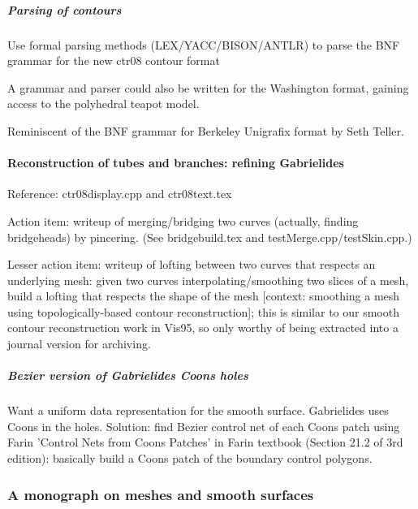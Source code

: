 \documentclass[11pt]{article}
\begin{document}

\subparagraph{Parsing of contours}

Use formal parsing methods (LEX/YACC/BISON/ANTLR) to parse the BNF grammar 
  for the new ctr08 contour format

A grammar and parser could also be written for the Washington format,
gaining access to the polyhedral teapot model.

Reminiscent of the BNF grammar for Berkeley Unigrafix format by Seth Teller.


\paragraph{Reconstruction of tubes and branches: refining Gabrielides}

Reference: ctr08display.cpp and ctr08text.tex

Action item: writeup of merging/bridging two curves (actually, finding bridgeheads) by pincering.
(See bridgebuild.tex and testMerge.cpp/testSkin.cpp.)

Lesser action item: writeup of lofting between two curves that respects an underlying mesh: 
given two curves interpolating/smoothing two slices of a mesh, 
build a lofting that respects the shape of the mesh [context: smoothing a mesh
using topologically-based contour reconstruction]; this is similar to our smooth contour
reconstruction work in Vis95, so only worthy of being extracted into a journal version for archiving.

\subparagraph{Bezier version of Gabrielides Coons holes}

Want a uniform data representation for the smooth surface.
Gabrielides uses Coons in the holes.
Solution: find Bezier control net of each Coons patch using Farin 'Control Nets from
Coons Patches' in Farin textbook (Section 21.2 of 3rd edition):
basically build a Coons patch of the boundary control polygons.


\subsubsection{A monograph on meshes and smooth surfaces}
\end{document}
